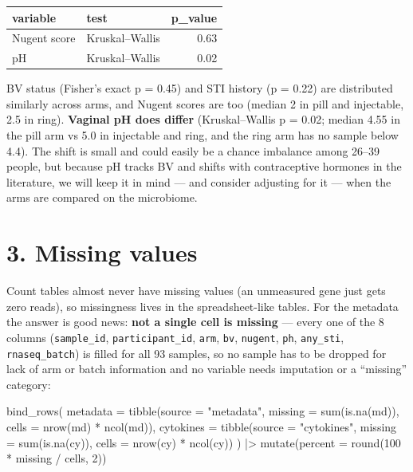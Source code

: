 \documentclass[
  letterpaper,
  DIV=11,
  numbers=noendperiod]{scrartcl}
\newenvironment{Shaded}{\begin{snugshade}}{\end{snugshade}}
\newcommand{\AttributeTok}[1]{\textcolor[rgb]{0.40,0.45,0.13}{#1}}
\newcommand{\DecValTok}[1]{\textcolor[rgb]{0.68,0.00,0.00}{#1}}
\newcommand{\FunctionTok}[1]{\textcolor[rgb]{0.28,0.35,0.67}{#1}}
\newcommand{\NormalTok}[1]{\textcolor[rgb]{0.00,0.23,0.31}{#1}}
\newcommand{\SpecialCharTok}[1]{\textcolor[rgb]{0.37,0.37,0.37}{#1}}
\newcommand{\StringTok}[1]{\textcolor[rgb]{0.13,0.47,0.30}{#1}}
\newcounter{none} %
\begin{document}
{\def\LTcaptype{none} %
\begin{longtable}[]{@{}llr@{}}
\toprule\noalign{}
variable & test & p\_value \\
\midrule\noalign{}
\endhead
\bottomrule\noalign{}
\endlastfoot
Nugent score & Kruskal--Wallis & 0.63 \\
pH & Kruskal--Wallis & 0.02 \\
\end{longtable}
}

BV status (Fisher's exact p = 0.45) and STI history (p = 0.22) are
distributed similarly across arms, and Nugent scores are too (median 2
in pill and injectable, 2.5 in ring). \textbf{Vaginal pH does differ}
(Kruskal--Wallis p = 0.02; median 4.55 in the pill arm vs 5.0 in
injectable and ring, and the ring arm has no sample below 4.4). The
shift is small and could easily be a chance imbalance among 26--39
people, but because pH tracks BV and shifts with contraceptive hormones
in the literature, we will keep it in mind --- and consider adjusting
for it --- when the arms are compared on the microbiome.

\section{3. Missing values}\label{missing-values}

Count tables almost never have missing values (an unmeasured gene just
gets zero reads), so missingness lives in the spreadsheet-like tables.
For the metadata the answer is good news: \textbf{not a single cell is
missing} --- every one of the 8 columns (\texttt{sample\_id},
\texttt{participant\_id}, \texttt{arm}, \texttt{bv}, \texttt{nugent},
\texttt{ph}, \texttt{any\_sti}, \texttt{rnaseq\_batch}) is filled for
all 93 samples, so no sample has to be dropped for lack of arm or batch
information and no variable needs imputation or a ``missing'' category:

\begin{Shaded}
\begin{Highlighting}[]
\FunctionTok{bind\_rows}\NormalTok{(}
  \AttributeTok{metadata  =} \FunctionTok{tibble}\NormalTok{(}\AttributeTok{source =} \StringTok{"metadata"}\NormalTok{,  }\AttributeTok{missing =} \FunctionTok{sum}\NormalTok{(}\FunctionTok{is.na}\NormalTok{(md)),  }\AttributeTok{cells =} \FunctionTok{nrow}\NormalTok{(md) }\SpecialCharTok{*} \FunctionTok{ncol}\NormalTok{(md)),}
  \AttributeTok{cytokines =} \FunctionTok{tibble}\NormalTok{(}\AttributeTok{source =} \StringTok{"cytokines"}\NormalTok{, }\AttributeTok{missing =} \FunctionTok{sum}\NormalTok{(}\FunctionTok{is.na}\NormalTok{(cy)), }\AttributeTok{cells =} \FunctionTok{nrow}\NormalTok{(cy) }\SpecialCharTok{*} \FunctionTok{ncol}\NormalTok{(cy))}
\NormalTok{) }\SpecialCharTok{|\textgreater{}}
  \FunctionTok{mutate}\NormalTok{(}\AttributeTok{percent =} \FunctionTok{round}\NormalTok{(}\DecValTok{100} \SpecialCharTok{*}\NormalTok{ missing }\SpecialCharTok{/}\NormalTok{ cells, }\DecValTok{2}\NormalTok{))}
\end{Highlighting}
\end{Shaded}
\end{document}
